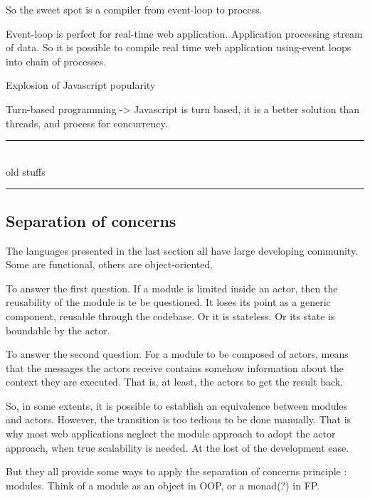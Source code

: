 So the sweet spot is a compiler from event-loop to process.


Event-loop is perfect for real-time web application.
Application processing stream of data.
So it is possible to compile real time web application using-event loops into chain of processes.



Explosion of Javascript popularity

Turn-based programming
  -> Javascript is turn based, it is a better solution than threads, and process for concurrency.






\begin{center}
\rule{4cm}{0.4pt}\\
old stuffs\\
\rule{4cm}{0.4pt}
\end{center}



\subsection{Separation of concerns}



The languages presented in the last section all have large developing community. Some are functional, others are object-oriented.

To answer the first question.
If a module is limited inside an actor, then the reusability of the module is te be questioned.
It loses its point as a generic component, reusable through the codebase.
Or it is stateless.
Or its state is boundable by the actor.

To answer the second question.
For a module to be composed of actors, means that the messages the actors receive contains somehow information about the context they are executed.
That is, at least, the actors to get the result back.

So, in some extents, it is possible to establish an equivalence between modules and actors. However, the transition is too tedious to be done manually.
That is why most web applications neglect the module approach to adopt the actor approach, when true scalability is needed.
At the lost of the development ease.


But they all provide some ways to apply the separation of concerns principle : modules.
Think of a module as an object in OOP, or a monad(?) in FP.

